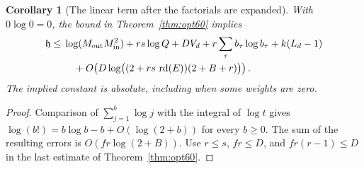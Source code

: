 \documentclass[a4paper,11pt]{article}
\newtheorem{corollary}[proposition]{Corollary}
\theoremstyle{definition}
\theoremstyle{remark}
\numberwithin{equation}{section}
\begin{document}
\begin{corollary}[The linear term after the factorials are expanded]\label{cor:linear60}
With \(0\log0=0\), the bound in Theorem~\ref{thm:opt60} implies
\begin{align*}
 \mathfrak h \le {}&
  \log(M_{\rm out}M_{\rm in}^2)+rs\log Q+D V_d
       +r\sum_\tau b_\tau\log b_\tau+k(L_d-1) \\
  &\quad +O\!\left(D\log\!\big( (2+rs\,\operatorname{rd}(E))
                                            (2+B+r)\big)\right).
\end{align*}
The implied constant is absolute, including when some weights
are zero.
\end{corollary}
\begin{proof}
Comparison of \(\sum_{j=1}^b\log j\) with the integral of \(\log t\)
gives \(\log(b!)=b\log b-b+O(\log(2+b))\) for every \(b\ge0\).
The sum of the resulting errors is \(O(fr\log(2+B))\).
Use \(r\le s\), \(fr\le D\), and \(fr(r-1)\le D\) in the last
estimate of Theorem~\ref{thm:opt60}.
\end{proof}
\end{document}
